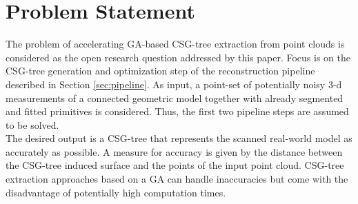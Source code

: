\section{Problem Statement}
\label{sec:prob}
The problem of accelerating \ac{GA}-based \ac{CSG}-tree extraction from point clouds is considered as the open research question addressed by this paper.
Focus is on the \ac{CSG}-tree generation and optimization step of the reconstruction pipeline described in Section \ref{sec:pipeline}.
As input, a point-set of potentially noisy $3$-d measurements of a connected geometric model together with already segmented and fitted primitives is considered.
Thus, the first two pipeline steps are assumed to be solved.
\\
The desired output is a \ac{CSG}-tree that represents the scanned real-world model as accurately as possible.
A measure for accuracy is given by the distance between the \ac{CSG}-tree induced surface and the points of the input point cloud.
\ac{CSG}-tree extraction approaches based on a \ac{GA} \cite{fayolle2016evolutionary} can handle 
inaccuracies but come with the disadvantage of potentially high computation times.
